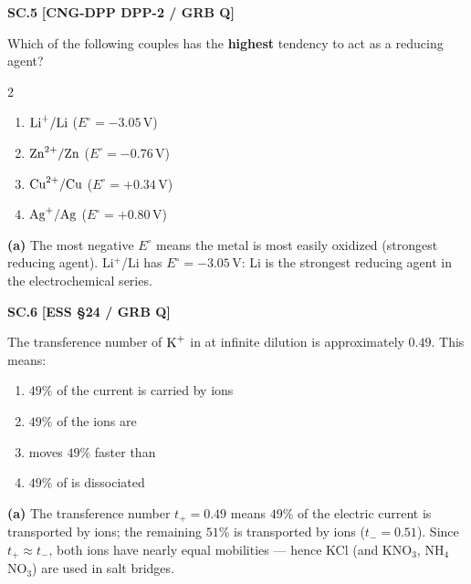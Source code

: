 \begin{problembox}
\textbf{SC.5} \hfill \textbf{[CNG-DPP DPP-2 / GRB Q]}

Which of the following couples has the \textbf{highest} tendency to act as a reducing agent?
\begin{multicols}{2}
\begin{enumerate}[label=(\alph*)]
    \item $\ce{Li+/Li}$ ($E^\circ = -3.05\,\text{V}$)
    \item $\ce{Zn^2+/Zn}$ ($E^\circ = -0.76\,\text{V}$)
    \item $\ce{Cu^2+/Cu}$ ($E^\circ = +0.34\,\text{V}$)
    \item $\ce{Ag+/Ag}$ ($E^\circ = +0.80\,\text{V}$)
\end{enumerate}
\end{multicols}
\end{problembox}
\begin{solution}
\textbf{(a)} The most negative $E^\circ$ means the metal is most easily oxidized (strongest reducing agent). Li$^+$/Li has $E^\circ = -3.05\,\text{V}$: Li is the strongest reducing agent in the electrochemical series.
\end{solution}

\begin{problembox}
\textbf{SC.6} \hfill \textbf{[ESS §24 / GRB Q]}

The transference number of $\ce{K+}$ in  at infinite dilution is approximately $0.49$. This means:
\begin{enumerate}[label=(\alph*)]
    \item $49\%$ of the current is carried by  ions
    \item $49\%$ of the ions are 
    \item {} moves $49\%$ faster than 
    \item $49\%$ of  is dissociated
\end{enumerate}
\end{problembox}
\begin{solution}
\textbf{(a)} The transference number $t_+ = 0.49$ means $49\%$ of the electric current is transported by  ions; the remaining $51\%$ is transported by  ions ($t_- = 0.51$). Since $t_+ \approx t_-$, both ions have nearly equal mobilities --- hence KCl (and KNO$_3$, NH$_4$NO$_3$) are used in salt bridges.
\end{solution}

